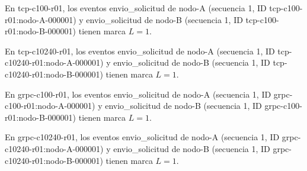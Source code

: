 En tcp-c100-r01, los eventos envio\_solicitud de nodo-A (secuencia 1, ID tcp-c100-r01:nodo-A-000001) y envio\_solicitud de nodo-B (secuencia 1, ID tcp-c100-r01:nodo-B-000001) tienen marca $L=1$.

En tcp-c10240-r01, los eventos envio\_solicitud de nodo-A (secuencia 1, ID tcp-c10240-r01:nodo-A-000001) y envio\_solicitud de nodo-B (secuencia 1, ID tcp-c10240-r01:nodo-B-000001) tienen marca $L=1$.

En grpc-c100-r01, los eventos envio\_solicitud de nodo-A (secuencia 1, ID grpc-c100-r01:nodo-A-000001) y envio\_solicitud de nodo-B (secuencia 1, ID grpc-c100-r01:nodo-B-000001) tienen marca $L=1$.

En grpc-c10240-r01, los eventos envio\_solicitud de nodo-A (secuencia 1, ID grpc-c10240-r01:nodo-A-000001) y envio\_solicitud de nodo-B (secuencia 1, ID grpc-c10240-r01:nodo-B-000001) tienen marca $L=1$.
